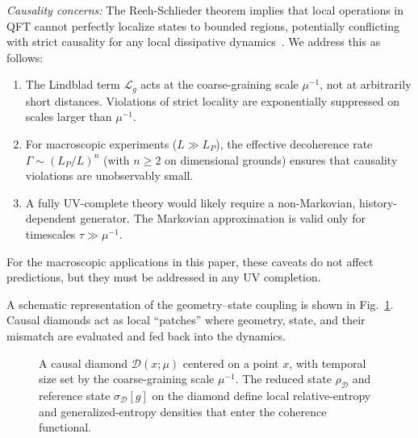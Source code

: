 \documentclass[aps,prd,twocolumn,superscriptaddress,nofootinbib,floatfix]{revtex4-2}
\newcommand{\Ddom}{\mathcal{D}}
\newcommand{\sr}{s_{\mathrm{rel}}}
\newcommand{\stot}{s_{\mathrm{tot}}}
\begin{document}
\emph{Causality concerns:} The Reeh-Schlieder theorem implies that local operations in QFT cannot perfectly localize states to bounded regions, potentially conflicting with strict causality for any local dissipative dynamics~\cite{Haag1992}. We address this as follows:
\begin{enumerate}
    \item The Lindblad term $\mathcal{L}_g$ acts at the coarse-graining scale $\mu^{-1}$, not at arbitrarily short distances. Violations of strict locality are exponentially suppressed on scales larger than $\mu^{-1}$.
    \item For macroscopic experiments ($L \gg L_P$), the effective decoherence rate $\Gamma \sim (L_P/L)^n$ (with $n \geq 2$ on dimensional grounds) ensures that causality violations are unobservably small.
    \item A fully UV-complete theory would likely require a non-Markovian, history-dependent generator. The Markovian approximation is valid only for timescales $\tau \gg \mu^{-1}$.
\end{enumerate}
For the macroscopic applications in this paper, these caveats do not affect predictions, but they must be addressed in any UV completion.



A schematic representation of the geometry--state coupling is shown in Fig.~\ref{fig:diamond}.
Causal diamonds act as local ``patches'' where geometry, state, and their mismatch are evaluated and fed back into the dynamics.

\begin{figure}[t]
    \centering
    \caption{A causal diamond $\Ddom(x;\mu)$ centered on a point $x$, with temporal size set by the coarse-graining scale $\mu^{-1}$. The reduced state $\rho_{\Ddom}$ and reference state $\sigma_{\Ddom}[g]$ on the diamond define local relative-entropy and generalized-entropy densities that enter the coherence functional.}
    \label{fig:diamond}
\end{figure}
\end{document}
